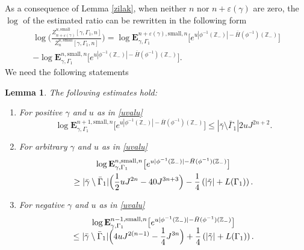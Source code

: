 \documentclass[JEP,XML,SOM,Unicode, NoFloatCountersInSection]{cedram}
\newenvironment{enumeratei}
{\bgroup\def\theenumi{\roman{enumi}}\def\theenumii{\Alph{enumii}}\begin{enumerate}}
{\end{enumerate}\egroup}
\numberwithin{equation}{section}
\theoremstyle{plain}
\newtheorem{lemma}[theorem]{Lemma}
\theoremstyle{definition}
\newcommand{\sm}{\mathrm{small}}
\newcommand{\bE}{{\ensuremath{\mathbf E}} }
\newcommand{\bbZ}{{\ensuremath{\mathbb Z}} }
\newcommand{\gep}{\varepsilon}
\newcommand{\gG}{\Gamma}
\begin{document}
As a consequence of Lemma \ref{zilak},
when neither $n$ nor $n+\gep(\gamma)$ are zero, the $\log$ of the estimated ratio can be rewritten in the following form
\begin{multline}\label{crounch}
\log \biggl(\frac{ Z^{u,\sm}_{n+\gep(\gamma)}[\gamma,\Gamma_1,n]}{ Z^{u,\sm}_{n}[\gamma,\Gamma_1,n]}\biggr)=
\log \bE^{n+\gep(\gamma),\sm,n}_{\gamma,\gG_1}\bigl[ e^{u |\phi^{-1}(\bbZ_-)|- \bar H(\phi^{-1})(\bbZ_-)} \bigr] \\[-3pt]
- \log
\bE^{n,\sm,n}_{\gamma,\gG_1}\bigl[ e^{u |\phi^{-1}(\bbZ_-)|- \bar H(\phi^{-1})(\bbZ_-)} \bigr].
\end{multline}
We need the following statements
\begin{lemma}\label{dalo}
The following estimates hold:
\begin{enumeratei}
\item\label{dalo1}
For positive $\gamma$ and $u$ as in \eqref{uvalu}
\begin{equation*}
\log \bE^{n+1,\sm,n}_{\gamma,\gG_1}\bigl[ e^{u |\phi^{-1}(\bbZ_-)|- \bar H(\phi^{-1})(\bbZ_-)} \bigr]\le |\bar \gamma \setminus \bar \Gamma_1| 2u J^{2n+2}.
\end{equation*}
\item\label{dalo2}
For arbitrary $\gamma$ and $u$ as in \eqref{uvalu}
\begin{multline}\label{ckonveu}
\log \bE^{n,\sm, n}_{\gamma,\gG_1}\bigl[ e^{u |\phi^{-1}(\bbZ_-)|- \bar H(\phi^{-1})(\bbZ_-)} \bigr]\\
\ge |\bar \gamma \setminus \bar \Gamma_1|
\Bigl(\frac{1}{2}u J^{2n}- 40 J^{3n+3}\Bigr)-\frac{1}{4}\left(|\tilde \gamma|+L(\gG_1) \right).
\end{multline}
\item\label{dalo3}
For negative $\gamma$ and $u$ as in \eqref{uvalu}
\begin{multline*}%
\log \bE^{n-1,\sm, n}_{\gamma,\gG_1}\bigl[ e^{u |\phi^{-1}(\bbZ_-)|- \bar H(\phi^{-1})(\bbZ_-)} \bigr]\\[-5pt]
\le |\bar \gamma \setminus \bar \Gamma_1|
\Bigl(4u J^{2(n-1)}-\frac{1}{4}J^{3n}\Bigr)+\frac{1}{4}\left(|\tilde \gamma|+L(\gG_1) \right).
\end{multline*}
\end{enumeratei}
\end{lemma}
\end{document}

